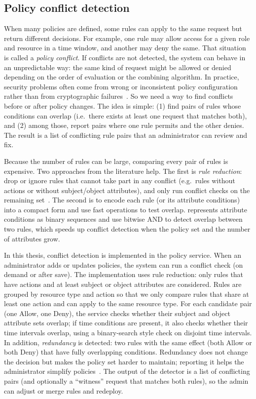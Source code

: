 \subsection{Policy conflict detection}
\label{sec:policy-conflict-detection}
When many policies are defined, some rules can apply to the same request but return different decisions. For example, one rule may allow access for a given role and resource in a time window, and another may deny the same. That situation is called a \emph{policy conflict}. If conflicts are not detected, the system can behave in an unpredictable way: the same kind of request might be allowed or denied depending on the order of evaluation or the combining algorithm. In practice, security problems often come from wrong or inconsistent policy configuration rather than from cryptographic failures~\cite{Zheng2019ABAC}. So we need a way to find conflicts before or after policy changes. The idea is simple: (1) find pairs of rules whose conditions can overlap (i.e.\ there exists at least one request that matches both), and (2) among those, report pairs where one rule permits and the other denies. The result is a list of conflicting rule pairs that an administrator can review and fix.
\vspace{0.5cm}

Because the number of rules can be large, comparing every pair of rules is expensive. Two approaches from the literature help. The first is \emph{rule reduction}: drop or ignore rules that cannot take part in any conflict (e.g.\ rules without actions or without subject/object attributes), and only run conflict checks on the remaining set~\cite{Shu2009Conflicts}. The second is to encode each rule (or its attribute conditions) into a compact form and use fast operations to test overlap.\cite{Zheng2019ABAC} represents attribute conditions as binary sequences and use bitwise AND to detect overlap between two rules, which speeds up conflict detection when the policy set and the number of attributes grow.
\vspace{0.5cm}


In this thesis, conflict detection is implemented in the policy service. When an administrator adds or updates policies, the system can run a conflict check (on demand or after save). The implementation uses rule reduction: only rules that have actions and at least subject or object attributes are considered. Rules are grouped by resource type and action so that we only compare rules that share at least one action and can apply to the same resource type. For each candidate pair (one Allow, one Deny), the service checks whether their subject and object attribute sets overlap; if time conditions are present, it also checks whether their time intervals overlap, using a binary-search style check on disjoint time intervals. In addition, \emph{redundancy} is detected: two rules with the same effect (both Allow or both Deny) that have fully overlapping conditions. Redundancy does not change the decision but makes the policy set harder to maintain; reporting it helps the administrator simplify policies~\cite{Zheng2019ABAC}. The output of the detector is a list of conflicting pairs (and optionally a ``witness'' request that matches both rules), so the admin can adjust or merge rules and redeploy.

